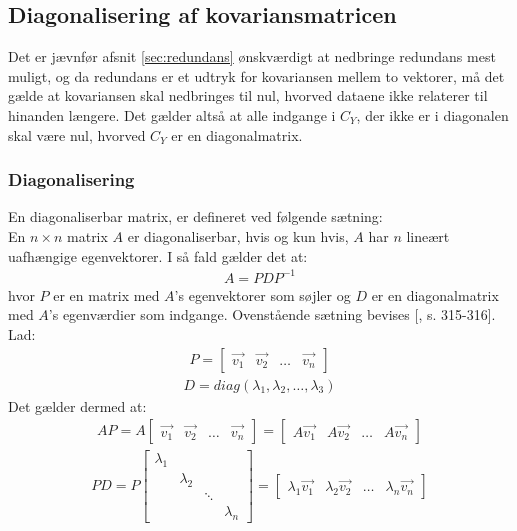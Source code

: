 \subsection{Diagonalisering af kovariansmatricen}
Det er jævnfør afsnit \vref{sec:redundans} ønskværdigt at nedbringe redundans mest muligt, og da redundans er et udtryk for kovariansen mellem to vektorer, må det gælde at kovariansen skal nedbringes til nul, hvorved dataene ikke relaterer til hinanden længere. Det gælder altså at alle indgange i $C_Y$, der ikke er i diagonalen skal være nul, hvorved $C_Y$ er en diagonalmatrix.

\subsubsection{Diagonalisering} \label{sec:diagonalisering}
En diagonaliserbar matrix, er defineret ved følgende sætning:\\
En $n \times n$ matrix $A$ er diagonaliserbar, hvis og kun hvis, $A$ har $n$ lineært uafhængige egenvektorer. I så fald gælder det at:
\begin{align}
A = PDP^{-1}
\label{eq:diagonalisering}
\end{align}
hvor $P$ er en matrix med $A$'s egenvektorer som søjler og $D$ er en diagonalmatrix med $A$'s egenværdier som indgange.
Ovenstående sætning bevises [\citet{linalg}, s. 315-316]. Lad:
\begin{align*} P = \begin{bmatrix} \vec{v_1} & \vec{v_2} & \hdots & \vec{v_n} \end{bmatrix} \end{align*}
\begin{align*} D = diag(\lambda_1, \lambda_2, …, \lambda_3) \end{align*}
Det gælder dermed at:
\begin{align*} AP = A\begin{bmatrix} \vec{v_1} & \vec{v_2} & \hdots & \vec{v_n} \end{bmatrix} = \begin{bmatrix} A\vec{v_1} & A\vec{v_2} & \hdots & A\vec{v_n} \end{bmatrix} \end{align*}
\begin{align*} PD = P\begin{bmatrix}
\lambda_1			\\
&	\lambda_2		\\
&&	\ddots			\\
&&&	\lambda_n
\end{bmatrix} = \begin{bmatrix} \lambda_1\vec{v_1} & \lambda_2\vec{v_2} & \hdots & \lambda_n\vec{v_n} \end{bmatrix} \end{align*}
